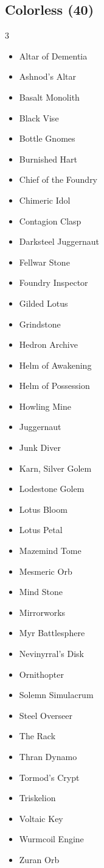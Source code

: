 \documentclass[11pt]{article}
\begin{document}
\subsection*{Colorless (40)}
\begin{multicols}{3}
\footnotesize
\begin{itemize}[leftmargin=1em,itemsep=0pt,parsep=0pt]
\item Altar of Dementia
\item Ashnod's Altar
\item Basalt Monolith
\item Black Vise
\item Bottle Gnomes
\item Burnished Hart
\item Chief of the Foundry
\item Chimeric Idol
\item Contagion Clasp
\item Darksteel Juggernaut
\item Fellwar Stone
\item Foundry Inspector
\item Gilded Lotus
\item Grindstone
\item Hedron Archive
\item Helm of Awakening
\item Helm of Possession
\item Howling Mine
\item Juggernaut
\item Junk Diver
\item Karn, Silver Golem
\item Lodestone Golem
\item Lotus Bloom
\item Lotus Petal
\item Mazemind Tome
\item Mesmeric Orb
\item Mind Stone
\item Mirrorworks
\item Myr Battlesphere
\item Nevinyrral's Disk
\item Ornithopter
\item Solemn Simulacrum
\item Steel Overseer
\item The Rack
\item Thran Dynamo
\item Tormod's Crypt
\item Triskelion
\item Voltaic Key
\item Wurmcoil Engine
\item Zuran Orb
\end{itemize}
\end{multicols}
\end{document}
